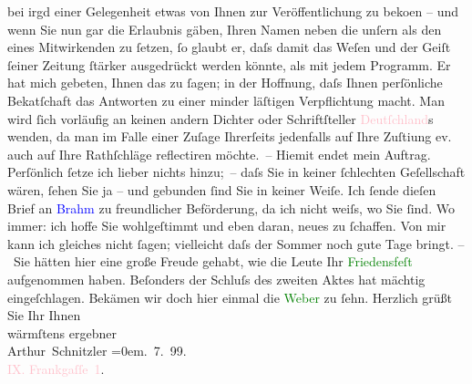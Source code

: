                     bei irgd einer Gelegenheit etwas von Ihnen zur Veröffentlichung zu beko{\geminationm}en – und wenn Sie nun gar die Erlaubnis gäben,
                    Ihren Namen neben die unſern als den eines Mitwirkenden zu ſetzen, ſo glaubt er,
                    daſs damit das Weſen und der Geiſt ſeiner Zeitung ſtärker {\pb}ausgedrückt werden könnte, als mit jedem Programm. Er hat mich gebeten, Ihnen
                    das zu ſagen; in der Hoffnung, daſs Ihnen perſönliche Beka{\geminationn}tſchaft das Antworten zu einer minder läſtigen
                    Verpflichtung macht. Man wird ſich vorläufig an keinen andern Dichter oder
                    Schriftſteller \textcolor{pink}{Deutſch{\pb}land}{}\ledrightnote{\textcolor{pink}{Deutschland}}s wenden, da man im Falle einer Zuſage Ihrerſeits jedenfalls auf Ihre
                        Zuſti{\geminationm}ung ev. auch auf Ihre Rathſchläge
                    reflectiren möchte. –\pend
           \pstart
           Hiemit endet mein Auftrag. Perſönlich ſetze ich lieber nichts hinzu; – daſs Sie
                    in keiner ſchlechten Geſellschaft wären, ſehen Sie ja – und gebunden ſind {\pb}Sie in keiner Weiſe.\pend
           \pstart
           Ich ſende dieſen Brief an \textcolor{blue}{Brahm}{}\ledrightnote{\textcolor{blue}{Otto Brahm}} zu
                    freundlicher Beförderung, da ich nicht weiſs, wo Sie ſind. Wo immer: ich hoffe
                    Sie wohlgeſtimmt und eben daran, neues zu ſchaffen.\pend
           \pstart
           Von mir kann ich gleiches nicht ſagen; vielleicht daſs der Sommer noch gute Tage
                        bringt.\pend
           \pstart
           {\pb}– Sie hätten hier eine große Freude gehabt, wie die Leute
                    Ihr \textcolor{green}{Friedensfeſt}{}\ledrightnote{\textcolor{green}{Das Friedensfest}} aufgenommen haben. Beſonders
                    der Schluſs des zweiten Aktes hat mächtig eingeſchlagen. Bekämen wir doch hier
                    einmal die \textcolor{green}{Weber}{}\ledrightnote{\textcolor{green}{Die Weber. Schauspiel aus den vierziger Jahren}} zu ſehn.\pend
           \pstart
           Herzlich grüßt Sie Ihr Ihnen{\\[\baselineskip]}wärmſtens ergebner{\\[\baselineskip]}\spacefill\mbox{Arthur Schnitzler}\pend
           \leftskip=0em{}. 7. 99.{\\}\textcolor{pink}{IX. Frankgaſſe 1}{}\ledrightnote{\textcolor{pink}{Frankgasse}}.
                \pend
           \endnumbering{}  
      